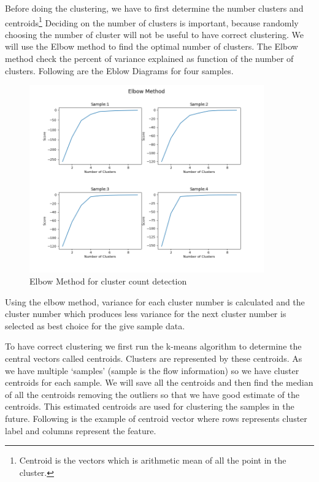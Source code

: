 \documentclass[10pt,oneside,a4paper]{article}
\begin{document}
Before doing the clustering, we have to first determine the number clusters and centroids\footnote{Centroid is the vectors which is arithmetic mean of all the point in the cluster.} Deciding on the number of clusters is important, because randomly choosing the number of cluster will not be useful to have correct clustering. We will use the Elbow method to find the optimal number of clusters. The Elbow method check the percent of variance explained as function of the number of clusters. Following are the Eblow Diagrams for four samples.

\begin{figure}[H]
\centering
\includegraphics[width=0.90\textwidth]{elbow-method.png}
\caption{Elbow Method for cluster count detection} \label{fig:elbowmethod}
\end{figure}

Using the elbow method, variance for each cluster number is calculated and the cluster number which produces less variance for the next cluster number is selected as best choice for the give sample data.

To have correct clustering we first run the k-means algorithm to determine the central vectors called centroids. Clusters are represented by these centroids. As we have multiple `samples' (sample is the flow information) so we have cluster centroids for each sample. We will save all the centroids and then find the median of all the centroids removing the outliers so that we have good estimate of the centroids. This estimated centroids are used for clustering the samples in the future. Following is the example of centroid vector where rows represents cluster label and columns represent the feature.
\end{document}
